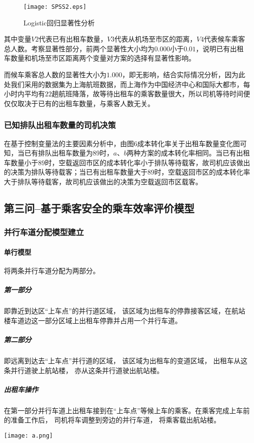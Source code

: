 \documentclass[withoutpreface,bwprint]{cumcmthesis} %
\begin{document}
 \begin{figure}[H]
  	\centering
	\texttt{[image: SPSS2.eps]}
  	\caption{Logistic回归显著性分析}
  \end{figure}

其中变量$V2$代表已有出租车数量，$V3$代表从机场至市区的距离，$V4$代表候车乘客总人数。考察显著性部分，前两个显著性大小均为$0.000$小于$0.01$，说明已有出租车数量和机场至市区距离两个变量对方案的选择有显著性影响。

而候车乘客总人数的显著性大小为$1.000$，即无影响，结合实际情况分析，因为此处我们采用的数据集为上海航班数据，而上海作为中国经济中心和国际大都市，每小时内平均有$22$趟航班降落，故等待出租车的乘客数量很大，所以司机等待时间便仅仅取决于已有的出租车数量，与乘客人数无关。

\subsubsection{已知排队出租车数量的司机决策}
在基于控制变量法的主要因素分析中，由图$6$成本转化率关于出租车数量变化图可知，当已有排队出租车数量为$89$时，$a$、$b$两种方案的成本转化率相同。当已有出租车数量小于$89$时，空载返回市区的成本转化率小于排队等待载客，故司机应该做出的决策为排队等待载客；当已有出租车数量大于$89$时，空载返回市区的成本转化率大于排队等待载客，故司机应该做出的决策为空载返回市区载客。



\subsection{第三问--基于乘客安全的乘车效率评价模型}
\subsubsection{并行车道分配模型建立}
\paragraph{单行模型}将两条并行车道分配为两部分。
\subparagraph{第一部分}
即靠近到达区“上车点”的并行道区域， 该区域为出租车的停靠接客区域，在航站楼车道边这一部分区域上出租车停靠并占用一个并行车道。 
\subparagraph{第二部分}即远离到达去“上车点”并行道的区域， 该区域为出租车的变道区域， 出租车从这条并行道驶上航站楼， 亦从这条并行道驶出航站楼。
\subparagraph{出租车操作}
 在第一部分并行车道上出租车接到在“上车点”等候上车的乘客。在乘客完成上车前的准备工作后， 司机将车调整到旁边的并行车道， 将乘客载出航站楼。

 \begin{center}
 	\texttt{[image: a.png]}
 \end{center}
\end{document}
